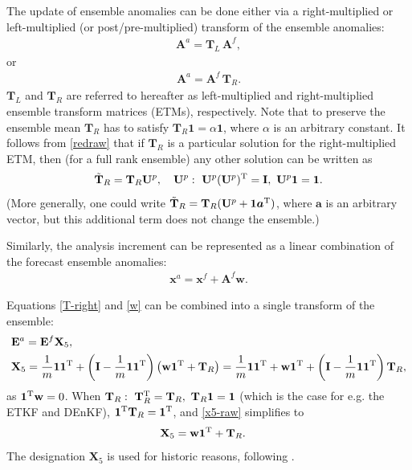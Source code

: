 \documentclass[11pt]{report}
\newcommand{\mb} {\mathbf}
\newcommand{\ms} {\boldsymbol}
\newcommand{\T}{^{\tiny \mathrm T}}
\begin{document}
The update of ensemble anomalies can be done either via a right-multiplied or left-multiplied (or post/pre-multiplied) transform of the ensemble anomalies:
\begin{align}
  \label{T-left}
  \mb A^a = \mb T_L \,\mb A^f,
\end{align}
or
\begin{align}
  \label{T-right}
  \mb A^a = \mb A^f \, \mb T_R.
\end{align}
$\mb T_L$ and $\mb T_R$ are referred to hereafter as left-multiplied and right-multiplied ensemble transform matrices (ETMs), respectively.
Note that to preserve the ensemble mean $\mb T_R$ has to satisfy $\mb T_R \mb 1 = \alpha \mb 1$, where $\alpha$ is an arbitrary constant.
It follows from \eqref{redraw} that if $\mb T_R$ is a particular solution for the right-multiplied ETM, then (for a full rank ensemble) any other solution can be written as
\begin{align}
  \label{TR-all}
  \tilde{\mb T}_R = \mb T_R \mb U^p, \quad \mb U^p:\ \mb U^p (\mb U^p)\T = \mb I,\ \mb U^p \mb 1 = \mb 1.
\end{align}
(More generally, one could write $\tilde{\mb T}_R = \mb T_R (\mb U^p + \mb 1 \ms a\T)$, where $\ms a$ is an arbitrary vector, but this additional term does not change the ensemble.)

Similarly, the analysis increment can be represented as a linear combination of the forecast ensemble anomalies:
\begin{align}
  \label{w}
  \mb x^a = \mb x^f + \mb A^f \mb w.
\end{align}

Equations \eqref{T-right} and \eqref{w} can be combined into a single transform of the ensemble:
\begin{align}
  \label{x5-def}
  & \mb E^a = \mb E^f \mb X_5,\\
  \label{x5-raw}
  & \mb X_5 = \frac{1}{m} \mb 1 \mb 1\T + \left( \mb I - \frac{1}{m} \mb 1 \mb 1\T\right) \left( \mb w \mb 1\T + \mb T_R\right)
  = \frac{1}{m} \mb 1 \mb 1\T + \mb w \mb 1\T + \left( \mb I - \frac{1}{m} \mb 1 \mb 1\T \right) \mb T_R,
\end{align}
as $\mb 1\T \mb w = 0$. 
When $\mb T_R:\ \mb T_R\T = \mb T_R,\ \mb T_R \mb 1 = \mb 1$ (which is the case for e.g. the ETKF and DEnKF), $\mb 1\T \mb T_R = \mb 1\T$, and \eqref{x5-raw} simplifies to
\begin{align}
  \label{x5}
  & \mb X_5 = \mb w \mb 1\T + \mb T_R.
\end{align}
The designation $\mb X_5$ is used for historic reasons, following \citet{eve03a}.
\end{document}
